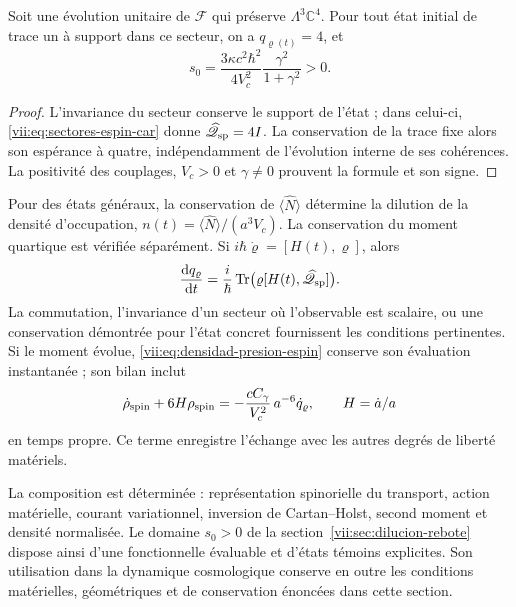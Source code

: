 \begin{corollary}
\label{vii:cor:dominio-positivo-conservado}
Soit une évolution unitaire de \(\mathcal F\) qui préserve
\(\Lambda^3\mathbb C^4\). Pour tout état initial de trace un
à support dans ce secteur, on a \(q_{\varrho(t)}=4\), et
\begin{equation}
 s_0=\frac{3\kappa c^2\hbar^2}{4V_c^2}
                   \frac{\gamma^2}{1+\gamma^2}>0.
 \label{vii:eq:amplitud-positiva-sector-tres}
\end{equation}
\end{corollary}
\begin{proof}
L'invariance du secteur conserve le support de l'état ; dans celui-ci,
\eqref{vii:eq:sectores-espin-car} donne
\(\widehat{\mathscr Q}_{\rm sp}=4I\). La conservation de la
trace fixe alors son espérance à quatre, indépendamment de
l'évolution interne de ses cohérences. La positivité des
couplages, \(V_c>0\) et \(\gamma\ne0\) prouvent la formule
et son signe.
\end{proof}

Pour des états généraux, la conservation de
\(\langle\widehat N\rangle\) détermine la dilution de la densité
d'occupation, \(n(t)=\langle\widehat N\rangle/(a^3V_c)\).
La conservation du moment quartique est vérifiée séparément.
Si \(i\hbar\dot\varrho=[H(t),\varrho]\), alors
\begin{equation}
 \frac{\mathrm d q_\varrho}{\mathrm dt}
 =\frac{i}{\hbar}\operatorname{Tr}
       \bigl(\varrho[H(t),\widehat{\mathscr Q}_{\rm sp}]\bigr).
 \label{vii:eq:conservacion-momento-cuartico}
\end{equation}
La commutation, l'invariance d'un secteur où l'observable est scalaire, ou une conservation démontrée pour l'état concret fournissent les conditions pertinentes. Si le moment évolue, \eqref{vii:eq:densidad-presion-espin} conserve son évaluation instantanée ; son bilan inclut
\[
 \dot\rho_{\rm spin}+6H\rho_{\rm spin}
 =-\frac{cC_\gamma}{V_c^2}\,a^{-6}\dot q_\varrho,
 \qquad H=\dot a/a
\]
en temps propre. Ce terme enregistre l'échange avec les
autres degrés de liberté matériels.

La composition est déterminée : représentation spinorielle du
transport, action matérielle, courant variationnel, inversion de
Cartan--Holst, second moment et densité normalisée. Le domaine
\(s_0>0\) de la section~\ref{vii:sec:dilucion-rebote} dispose ainsi
d'une fonctionnelle évaluable et d'états témoins explicites. Son utilisation dans
la dynamique cosmologique conserve en outre les conditions matérielles,
géométriques et de conservation énoncées dans cette section.
